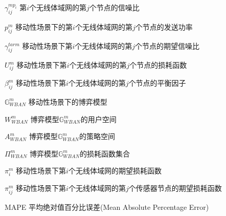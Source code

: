 \begin{denotation}
\item[${\gamma _{ij}^{mp_i}}$] 第$i$个无线体域网的第$j$个节点的信噪比
\item[$p_{ij}^m$] 移动性场景下的第$i$个无线体域网的第$j$个节点的发送功率
\item[$\gamma _{ij}^{tar m}$] 移动性场景下第$i$个无线体域网的第$j$个节点的期望信噪比
\item[$U_{ij}^m$] 移动性场景下第$i$个无线体域网的第$j$个节点的损耗函数
\item[$\beta_{ij}^m$] 移动性场景下第$i$个无线体域网的第$j$个节点的平衡因子
\item[$\mathbb{G}_{WBAN}^m$] 移动性场景下的博弈模型
\item[$W_{WBAN}^m$] 博弈模型$\mathbb{G}_{WBAN}^m$的用户空间
\item[$A_{WBAN}^m$] 博弈模型$\mathbb{G}_{WBAN}^m$的策略空间
\item[$\Pi_{WBAN}^m$] 博弈模型$\mathbb{G}_{WBAN}^m$的损耗函数集合
\item[${\pi^m_i}$] 移动性场景下第$i$个无线体域网的期望损耗函数
\item[${\pi _{ij}^m}$] 移动性场景下第$i$个无线体域网的第$j$个传感器节点的期望损耗函数
\item[MAPE] 平均绝对值百分比误差(Mean Absolute Percentage Error)


\end{denotation}
